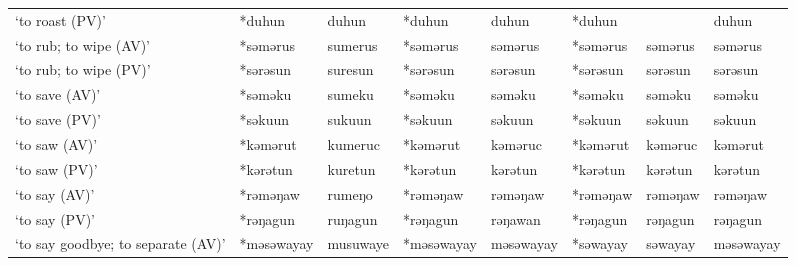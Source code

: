 \begin{landscape}
\begin{longtable}[c]{@{}p{3cm}<{\raggedright}p{2.75cm}<{\raggedright}p{2.75cm}<{\raggedright}p{2.75cm}<{\raggedright}p{2.75cm}<{\raggedright}p{2.75cm}<{\raggedright}p{2.75cm}<{\raggedright}p{2.75cm}<{\raggedright}@{}}
`to roast (PV)'                                      & *duhun       & duhun                         & *duhun         & duhun                      & *duhun           &                          & duhun                             \\
`to rub; to wipe (AV)'                               & *səmərus     & sumerus                       & *səmərus       & səmərus                    & *səmərus         & səmərus                  & səmərus                           \\
`to rub; to wipe (PV)'                               & *sərəsun     & suresun                       & *sərəsun       & sərəsun                    & *sərəsun         & sərəsun                  & sərəsun                           \\
`to save (AV)'                                       & *səməku      & sumeku                        & *səməku        & səməku                     & *səməku          & səməku                   & səməku                            \\
`to save (PV)'                                       & *səkuun      & sukuun                        & *səkuun        & səkuun                     & *səkuun          & səkuun                   & səkuun                            \\
`to saw (AV)'                                        & *kəmərut     & kumeruc                       & *kəmərut       & kəməruc                    & *kəmərut         & kəməruc                  & kəmərut                           \\
`to saw (PV)'                                        & *kərətun     & kuretun                       & *kərətun       & kərətun                    & *kərətun         & kərətun                  & kərətun                           \\
`to say (AV)'                                        & *rəməŋaw     & rumeŋo                        & *rəməŋaw       & rəməŋaw                    & *rəməŋaw         & rəməŋaw                  & rəməŋaw                           \\
`to say (PV)'                                        & *rəŋagun     & ruŋagun                       & *rəŋagun       & rəŋawan                    & *rəŋagun         & rəŋagun                  & rəŋagun                           \\
`to say goodbye; to separate (AV)'                   & *məsəwayay   & musuwaye                      & *məsəwayay     & məsəwayay                  & *səwayay         & səwayay                  & məsəwayay                         \\

\end{longtable}
\end{landscape}

